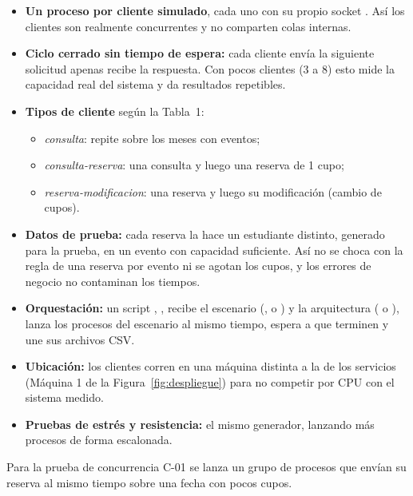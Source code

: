 \begin{itemize}
    \item \textbf{Un proceso por cliente simulado}, cada uno con su propio socket
          . Así los clientes son realmente concurrentes y no comparten
          colas internas.
    \item \textbf{Ciclo cerrado sin tiempo de espera:} cada cliente envía la siguiente
          solicitud apenas recibe la respuesta. Con pocos clientes (3 a 8) esto mide
          la capacidad real del sistema y da resultados repetibles.
    \item \textbf{Tipos de cliente} según la Tabla~1:
          \begin{itemize}
              \item \emph{consulta}: repite  sobre los meses con eventos;
              \item \emph{consulta-reserva}: una consulta y luego una reserva de 1 cupo;
              \item \emph{reserva-modificacion}: una reserva y luego su modificación
                    (cambio de cupos).
          \end{itemize}
    \item \textbf{Datos de prueba:} cada reserva la hace un estudiante distinto,
          generado para la prueba, en un evento con capacidad suficiente. Así no se
          choca con la regla de una reserva por evento ni se agotan los cupos, y los
          errores de negocio no contaminan los tiempos.
    \item \textbf{Orquestación:} un script ,
          , recibe el escenario
          (,  o ) y la arquitectura
          ( o ), lanza los procesos del escenario al mismo tiempo, espera a que terminen y
          une sus archivos CSV.
    \item \textbf{Ubicación:} los clientes corren en una máquina distinta a la de los
          servicios (Máquina 1 de la Figura~\ref{fig:despliegue}) para no competir por
          CPU con el sistema medido.
    \item \textbf{Pruebas de estrés y resistencia:} el mismo generador, lanzando más
          procesos de forma escalonada.
\end{itemize}

Para la prueba de concurrencia C-01 se lanza un grupo de procesos que envían su
reserva al mismo tiempo sobre una fecha con pocos cupos.
